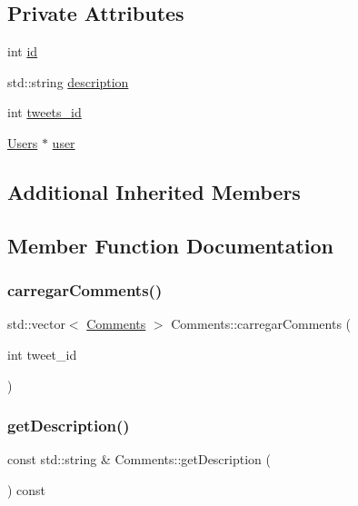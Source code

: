 \subsection*{Private Attributes}
\begin{DoxyCompactItemize}
\item 
int \hyperlink{class_comments_a62aa986c551ebac090962ab38b3841d6}{id}
\item 
std\+::string \hyperlink{class_comments_ad4073ce0c82aca8455a0ffe4170d03ec}{description}
\item 
int \hyperlink{class_comments_a024beb18bc87f76a1484f9edd4a64678}{tweets\+\_\+id}
\item 
\hyperlink{class_users}{Users} $\ast$ \hyperlink{class_comments_a8e0c8129a99373132b6a182fc817495f}{user}
\end{DoxyCompactItemize}
\subsection*{Additional Inherited Members}


\subsection{Member Function Documentation}
\mbox{\label{class_comments_ab7386b4ce9198b167e768c9ca7880a18}} 
\subsubsection{\texorpdfstring{carregar\+Comments()}{carregarComments()}}
{\footnotesize\ttfamily std\+::vector$<$ \hyperlink{class_comments}{Comments} $>$ Comments\+::carregar\+Comments (\begin{DoxyParamCaption}\item[{int}]{tweet\+\_\+id }\end{DoxyParamCaption})}

\mbox{\label{class_comments_a998baa3bb49d969dccbcc646cde03ea8}} 
\subsubsection{\texorpdfstring{get\+Description()}{getDescription()}}
{\footnotesize\ttfamily const std\+::string \& Comments\+::get\+Description (\begin{DoxyParamCaption}{ }\end{DoxyParamCaption}) const}

